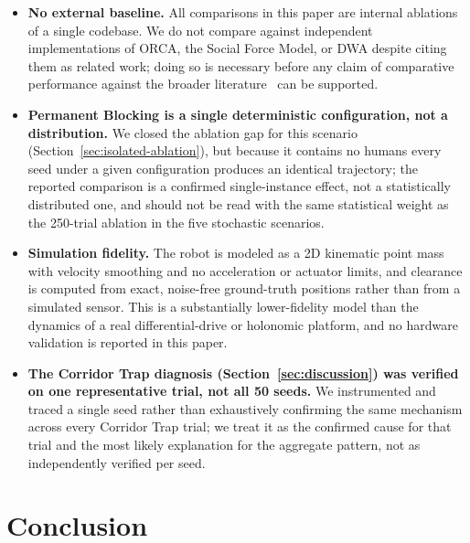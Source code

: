 \documentclass[conference,letterpaper,10pt]{ieeeconf}
\begin{document}
\begin{itemize}
  \item \textbf{No external baseline.} All comparisons in this paper are
  internal ablations of a single codebase. We do not compare against
  independent implementations of ORCA, the Social Force Model, or DWA
  despite citing them as related work; doing so is necessary before any
  claim of comparative performance against the broader
  literature~\cite{social_force,orca,dwa} can be supported.
  \item \textbf{Permanent Blocking is a single deterministic configuration,
  not a distribution.} We closed the ablation gap for this scenario
  (Section~\ref{sec:isolated-ablation}), but because it contains no humans
  every seed under a given configuration produces an identical trajectory;
  the reported comparison is a confirmed single-instance effect, not a
  statistically distributed one, and should not be read with the same
  statistical weight as the 250-trial ablation in the five stochastic
  scenarios.
  \item \textbf{Simulation fidelity.} The robot is modeled as a 2D
  kinematic point mass with velocity smoothing and no acceleration or
  actuator limits, and clearance is computed from exact, noise-free
  ground-truth positions rather than from a simulated sensor. This is a
  substantially lower-fidelity model than the dynamics of a real
  differential-drive or holonomic platform, and no hardware validation is
  reported in this paper.
  \item \textbf{The Corridor Trap diagnosis (Section~\ref{sec:discussion})
  was verified on one representative trial, not all 50 seeds.} We
  instrumented and traced a single seed rather than exhaustively confirming
  the same mechanism across every Corridor Trap trial; we treat it as the
  confirmed cause for that trial and the most likely explanation for the
  aggregate pattern, not as independently verified per seed.
\end{itemize}

\section{Conclusion}
\end{document}
